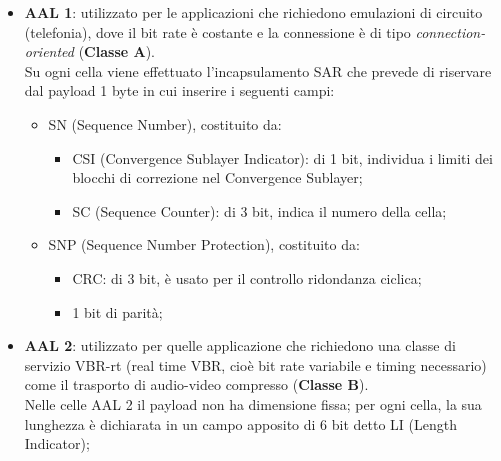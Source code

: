 \documentclass[a4paper,11pt]{article}
\begin{document}
\begin{itemize}
	\item \textbf{AAL 1}: utilizzato per le applicazioni che richiedono emulazioni di circuito (telefonia), dove il bit rate è costante e la connessione è di tipo \textit{connection-oriented} (\textbf{Classe A}).
	\\Su ogni cella viene effettuato l'incapsulamento SAR che prevede di riservare dal payload 1 byte in cui inserire i seguenti campi:
	\begin{itemize}
		\item SN (Sequence Number), costituito da:
		\begin{itemize}
			\item CSI (Convergence Sublayer Indicator): di 1 bit, individua i limiti dei blocchi di correzione nel Convergence Sublayer;
			\item SC (Sequence Counter): di 3 bit, indica il numero della 	cella;
		\end{itemize}
		\item SNP (Sequence Number Protection), costituito da:
		\begin{itemize}
			\item CRC: di 3 bit, è usato per il controllo ridondanza ciclica;
			\item 1 bit di parità;
		\end{itemize}
		
	\end{itemize}
	
	\item \textbf{AAL 2}: utilizzato per quelle applicazione che richiedono una classe di servizio VBR-rt (real time VBR, cioè bit rate variabile e timing necessario) come il trasporto di audio-video compresso (\textbf{Classe B}).
	\\Nelle celle AAL 2 il payload non ha dimensione fissa; per ogni cella, la sua lunghezza è dichiarata in un campo apposito di 6 bit detto LI (Length Indicator);
	

\end{itemize}
\end{document}
